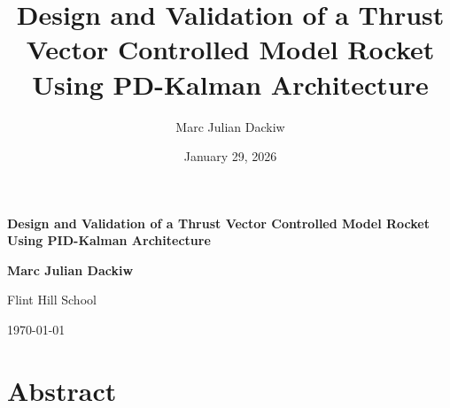 \documentclass[11pt, letterpaper]{article}
\title{Design and Validation of a Thrust Vector Controlled Model Rocket Using PD-Kalman Architecture}
\author{Marc Julian Dackiw}
\date{January 29, 2026}
\begin{document}
\begin{titlepage}
    \centering
    \vspace*{2cm}

    {\Huge \textbf{Design and Validation of a Thrust Vector Controlled Model Rocket Using PID-Kalman Architecture}}

    \vspace{1.5cm}

    {\Large \textbf{Marc Julian Dackiw}}

    \vspace{1cm}

    {\large Flint Hill School}

    \vfill

    {\Large \today}

\end{titlepage}


\section*{Abstract}


\newpage
\tableofcontents
\newpage

\setcounter{page}{1}









\newpage
\appendix


\newpage


\end{document}
